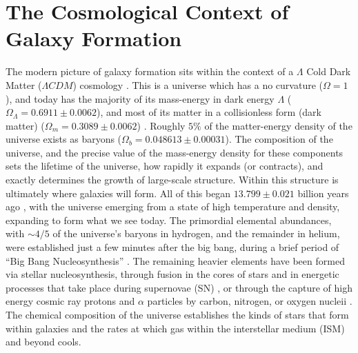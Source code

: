 \section{The Cosmological Context of Galaxy Formation} The modern picture of
galaxy formation sits within the context of a $\Lambda$ Cold Dark Matter
($\Lambda CDM$) cosmology \citep{Rees1977,White1978,Blumenthal1984,Mo1998}.
This is a universe which has a no curvature ($\Omega = 1$), and today has the
majority of its mass-energy in dark energy $\Lambda$ ($\Omega_\Lambda =
0.6911\pm0.0062$), and most of its matter in a collisionless form (dark matter)
($\Omega_m = 0.3089\pm0.0062$) \citep{Planck2015b}.  Roughly $5\%$ of the
matter-energy density of the universe exists as baryons ($\Omega_b =
0.048613\pm0.00031$).  The composition of the universe, and the precise value of
the mass-energy density for these components sets the lifetime of the universe,
how rapidly it expands (or contracts), and exactly determines the growth of
large-scale structure.  Within this structure is ultimately where galaxies will
form.  All of this began $13.799\pm0.021$ billion years ago \citep{Planck2015b},
with the universe emerging from a state of high temperature and density,
expanding to form what we see today.  The primordial elemental abundances, with
$\sim4/5$ of the universe's baryons in hydrogen, and the remainder in helium,
were established just a few minutes after the big bang, during a brief period of
``Big Bang Nucleosynthesis'' \citep{Alpher1948}.  The remaining heavier elements
have been formed via stellar nucleosynthesis, through fusion in the cores of
stars and in energetic processes that take place during supernovae (SN)
\citep{Wagoner1967}, or through the capture of high energy cosmic ray protons
and $\alpha$ particles by carbon, nitrogen, or oxygen nucleii
\citep{Reeves1970}.  The chemical composition of the universe establishes the
kinds of stars that form within galaxies and the rates at which gas within the
interstellar medium (ISM) and beyond cools.

